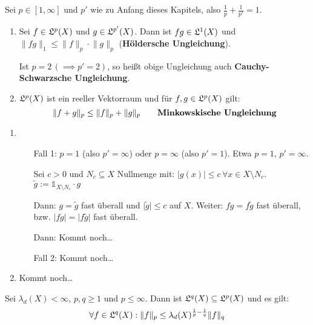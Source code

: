 \documentclass[a4paper,twoside,DIV15,BCOR12mm,chapterprefix=true,headings=onelinechapter]{scrbook}
\begin{document}
\begin{satz}
\label{Satz 16.1}
Sei \(p\in[1,\infty]\) und \(p'\) wie zu Anfang dieses Kapitels, also \(\frac{1}{p}+\frac{1}{p'}=1\).
\begin{enumerate}
\item Sei \(f\in\mathfrak{L}^{p}(X)\) und \(g\in\mathfrak{L}^{p'}(X)\).
Dann ist \(fg\in\mathfrak{L}^{1}(X)\) und \(\lVert fg\rVert_{1}\leq\lVert f\rVert_{p}\cdot\lVert g\rVert_{p}\) (\textbf{H\"oldersche Ungleichung}).

Ist \(p=2\,(\implies p'=2)\), so hei\ss t obige Ungleichung auch \textbf{Cauchy-Schwarzsche Ungleichung}.
\item \(\mathfrak{L}^{p}(X)\) ist ein reeller Vektorraum und f\"ur \(f,g\in\mathfrak{L}^{p}(X)\) gilt:
\[
\lVert f+g\rVert_{p}\leq\lVert f\rVert_{p}+\lVert g\rVert_{p}\qquad\text{\textbf{Minkowskische Ungleichung}}
\]
\end{enumerate}
\end{satz}

\begin{beweis}
\begin{enumerate}
\item
\begin{itemize}
\item[Fall 1:]  \(p=1\) (also \(p'=\infty\)) oder \(p=\infty\) (also \(p'=1\)). Etwa \(p=1,\,p'=\infty\).

Sei \(c>0\) und \(N_{c}\subseteq X\) Nullmenge mit: \(\lvert g(x)\rvert\leq c\,\forall x\in X\setminus N_{c}\). 
\(\tilde{g}:=\mathds{1}_{X\setminus N_{c}}\cdot g\)

Dann: \(g=\tilde{g}\) fast \"uberall und \(\lvert\tilde{g}\rvert\leq c\) auf \(X\). Weiter: \(fg=f\tilde{g}\) fast \"uberall,
bzw. \(\lvert fg\rvert=\lvert f\tilde{g}\rvert\) fast \"uberall.

Dann: Kommt noch\ldots
\item[Fall 2:]  Kommt noch\ldots
\end{itemize}
\item Kommt noch\ldots
\end{enumerate}
\end{beweis}

\begin{satz}
\label{Satz 16.2}
Sei $\lambda_d(X)<\infty$, $p,q\ge 1$ und $p\leq\infty$. Dann ist $\mathfrak{L}^q(X)\subseteq\mathfrak{L}^p(X)$ und es gilt:
\[\forall f\in\mathfrak{L}^q(X): \|f\|_p\le\lambda_d(X)^{\frac1p-\frac1q}\|f\|_q\]
\end{satz}
\end{document}
